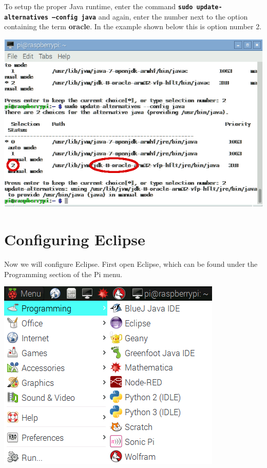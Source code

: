 \begin{enumerate}
To setup the proper Java runtime, enter the command \textbf{\texttt{sudo~update-alternatives~--config~java}} and again, enter the number next to the option containing the term \textbf{oracle}. In the example shown below this is option number 2.

\beforefig
\centerline{\includegraphics[height=1.5 in]{pi_images/setup/UpdatePackages5.jpg}}
\afterfig



\end{enumerate}

\iffalse %

\section{Configuring Eclipse}

Now we will configure Eclipse. First open Eclipse, which can be found under the Programming section of the Pi menu.


\beforefig
\centerline{\includegraphics[height=2.5 in]{pi_images/setup/ConfigureEclipse1.jpg}}
\afterfig

